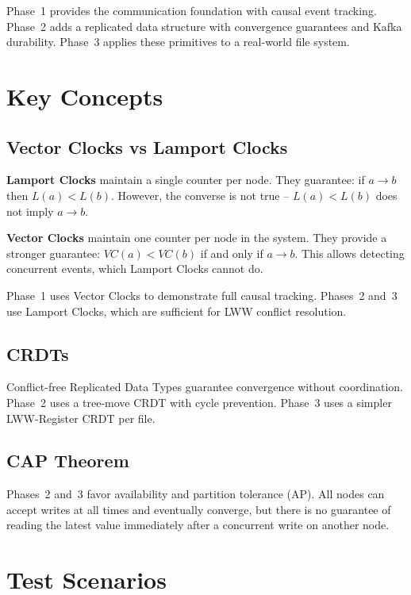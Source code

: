 \documentclass[12pt, a4paper]{article}
\begin{document}
Phase~1 provides the communication foundation with causal event tracking. Phase~2 adds a replicated data structure with convergence guarantees and Kafka durability. Phase~3 applies these primitives to a real-world file system.

\section{Key Concepts}

\subsection{Vector Clocks vs Lamport Clocks}

\textbf{Lamport Clocks} maintain a single counter per node. They guarantee: if $a \to b$ then $L(a) < L(b)$. However, the converse is not true -- $L(a) < L(b)$ does not imply $a \to b$.

\textbf{Vector Clocks} maintain one counter per node in the system. They provide a stronger guarantee: $VC(a) < VC(b)$ if and only if $a \to b$. This allows detecting concurrent events, which Lamport Clocks cannot do.

Phase~1 uses Vector Clocks to demonstrate full causal tracking. Phases~2 and~3 use Lamport Clocks, which are sufficient for LWW conflict resolution.

\subsection{CRDTs}

Conflict-free Replicated Data Types guarantee convergence without coordination. Phase~2 uses a tree-move CRDT with cycle prevention. Phase~3 uses a simpler LWW-Register CRDT per file.

\subsection{CAP Theorem}

Phases~2 and~3 favor availability and partition tolerance (AP). All nodes can accept writes at all times and eventually converge, but there is no guarantee of reading the latest value immediately after a concurrent write on another node.

\section{Test Scenarios}
\end{document}
